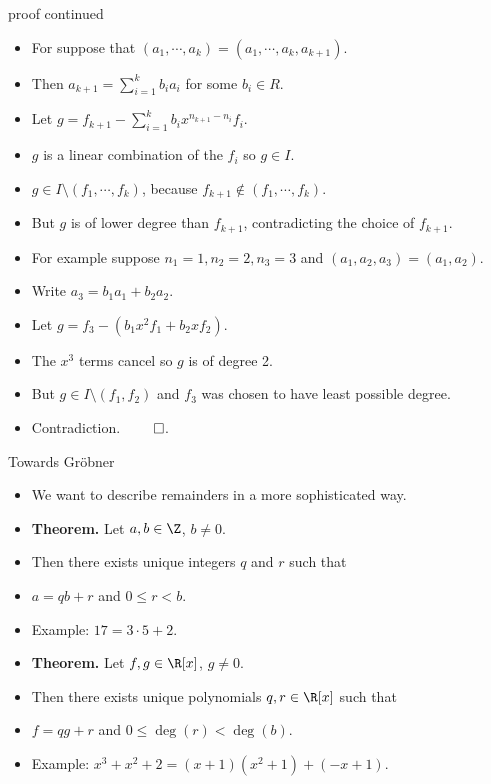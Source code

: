 \documentclass[handout]{beamer}
\begin{document}

\begin{frame}{proof continued}

\begin{itemize}
  \item For suppose that $(a_1,\cdots, a_k) = (a_1,\cdots, a_k, a_{k+1})$.
  \item Then $a_{k+1} = \sum_{i=1}^k b_i a_i$ for some $b_i\in R$.
  \item Let $g=f_{k+1} - \sum_{i=1}^kb_i x^{n_{k+1} - n_i} f_i$.
  \item $g$ is a linear combination of the $f_i$ so $g\in I$.
  \item $g \in I \setminus (f_1,\cdots,f_k)$, because $f_{k+1} \notin (f_1,\cdots,f_k)$.
  \item But $g$ is of
  lower degree than $f_{k+1}$, contradicting the choice of $f_{k+1}$.
  \item For example suppose $n_1 = 1, n_2 =2, n_3 = 3$ and $(a_1,a_2,a_3) = (a_1, a_2)$.
  \item Write $a_3 = b_1 a_1 + b_2 a_2$.
  \item Let $g=f_3 - (b_1 x^2 f_1 + b_2 x f_2)$.
  \item The $x^3$ terms cancel so $g$ is of degree 2.
  \item But $g \in I \setminus (f_1, f_2)$ and $f_3$ was chosen to have least possible degree.
  \item Contradiction. $\qed$.
\end{itemize}
\end{frame}



\begin{frame}{Towards Gr\"{o}bner}

\begin{itemize}
  \item We want to describe remainders in a more sophisticated way.
  \item \textbf{Theorem.} Let $a,b\in\Z$, $b\not=0$.
  \item Then there exists unique integers $q$ and $r$ such that
  \item $a = qb +r$ and $0\leq r < b$.
  \item Example: $17 = 3 \cdot 5 + 2$.
  \item \textbf{Theorem.} Let $f,g\in\R[x]$, $g\not=0$.
  \item Then there exists unique polynomials $q,r\in\R[x]$ such that
  \item $f = qg +r$ and $0\leq \deg(r) < \deg(b)$.
  \item Example: $x^3 + x^2 + 2 = (x+1)(x^2+1) + ( -x + 1)$.
\end{itemize}
\end{frame}
\end{document}

